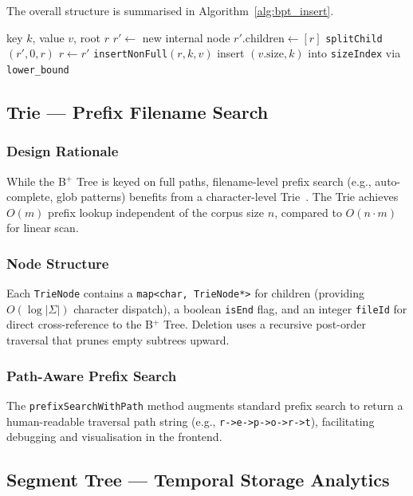 \documentclass[conference]{IEEEtran}
\begin{document}
The overall structure is summarised in Algorithm~\ref{alg:bpt_insert}.

\begin{algorithm}
\caption{B$^+$ Tree Insert}
\label{alg:bpt_insert}
\begin{algorithmic}[1]
\REQUIRE key $k$, value $v$, root $r$
  \STATE $r' \gets$ new internal node
  \STATE $r'.\text{children} \gets [r]$
  \STATE \texttt{splitChild}$(r', 0, r)$
  \STATE $r \gets r'$
\ENDIF
\STATE \texttt{insertNonFull}$(r, k, v)$
\STATE insert $(v.\text{size}, k)$ into \texttt{sizeIndex} via \texttt{lower\_bound}
\end{algorithmic}
\end{algorithm}

\subsection{Trie — Prefix Filename Search}

\subsubsection{Design Rationale}
While the B$^+$ Tree is keyed on full paths, filename-level prefix search (e.g., auto-complete, glob patterns) benefits from a character-level Trie~\cite{fredkin1960trie}. The Trie achieves $O(m)$ prefix lookup independent of the corpus size $n$, compared to $O(n \cdot m)$ for linear scan.

\subsubsection{Node Structure}
Each \texttt{TrieNode} contains a \texttt{map<char, TrieNode*>} for children (providing $O(\log |\Sigma|)$ character dispatch), a boolean \texttt{isEnd} flag, and an integer \texttt{fileId} for direct cross-reference to the B$^+$ Tree. Deletion uses a recursive post-order traversal that prunes empty subtrees upward.

\subsubsection{Path-Aware Prefix Search}
The \texttt{prefixSearchWithPath} method augments standard prefix search to return a human-readable traversal path string (e.g., \texttt{r->e->p->o->r->t}), facilitating debugging and visualisation in the frontend.

\subsection{Segment Tree — Temporal Storage Analytics}
\end{document}
